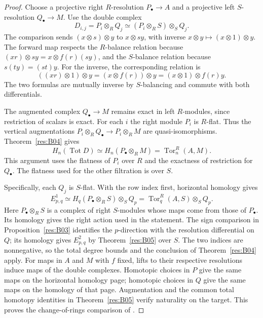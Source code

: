 \begin{proof}
Choose a projective right \(R\)-resolution \(P_\bullet\to A\)
and a projective left \(S\)-resolution \(Q_\bullet\to M\).
Use the double complex
\[
    D_{i,j}=P_i\otimes_R Q_j
          \simeq (P_i\otimes_R S)\otimes_S Q_j .
\]
The comparison sends \((x\otimes s)\otimes y\) to \(x\otimes sy\),
with inverse \(x\otimes y\mapsto(x\otimes1)\otimes y\). The forward
map respects the \(R\)-balance relation because
\((xr)\otimes sy=x\otimes f(r)(sy)\), and the \(S\)-balance relation
because \(s(ty)=(st)y\). For the inverse, the corresponding relation is
\[
   ((xr)\otimes1)\otimes y=(x\otimes f(r))\otimes y
                         =(x\otimes 1)\otimes f(r)y.
\]
The two formulas are mutually inverse by \(S\)-balancing and commute
with both differentials.

The augmented complex \(Q_\bullet\to M\) remains exact in left
\(R\)-modules, since restriction of scalars is exact.
For each \(i\) the right module \(P_i\) is \(R\)-flat. Thus the
vertical augmentations \(P_i\otimes_R Q_\bullet\to P_i\otimes_R M\)
are quasi-isomorphisms. Theorem~\ref{res:B04} gives
\[
  H_n(\operatorname{Tot}D)\simeq H_n(P_\bullet\otimes_R M)
          =\operatorname{Tor}^R_n(A,M).
\]
This argument uses the flatness of \(P_i\) over \(R\) and the
exactness of restriction for \(Q_\bullet\). The flatness used for
the other filtration is over \(S\).

Specifically, each \(Q_j\) is \(S\)-flat. With the row index first,
horizontal homology gives
\[
  E^1_{p,q}\simeq H_q(P_\bullet\otimes_R S)\otimes_S Q_p
      =\operatorname{Tor}^R_q(A,S)\otimes_S Q_p .
\]
Here \(P_\bullet\otimes_R S\) is a complex of right \(S\)-modules
whose maps come from those of \(P_\bullet\). Its homology gives
the right action used in the statement. The sign comparison in
Proposition~\ref{res:B03} identifies the \(p\)-direction with the
resolution differential on \(Q\); its homology gives
\(E^2_{p,q}\) by Theorem~\ref{res:B05} over \(S\).
The two indices are nonnegative, so the total degree bounds and the
conclusion of Theorem~\ref{res:B04} apply. For maps in \(A\) and \(M\)
with \(f\) fixed, lifts to their respective resolutions induce maps
of the double complexes. Homotopic choices in \(P\) give the same maps
on the horizontal homology page; homotopic choices in \(Q\) give the
same maps on the homology of that page. Augmentation and the common
total homotopy identities in Theorem~\ref{res:B05} verify naturality
on the target. This proves the change-of-rings comparison of
\cite[Theorem 5.6.6]{weibel}.
\end{proof}
